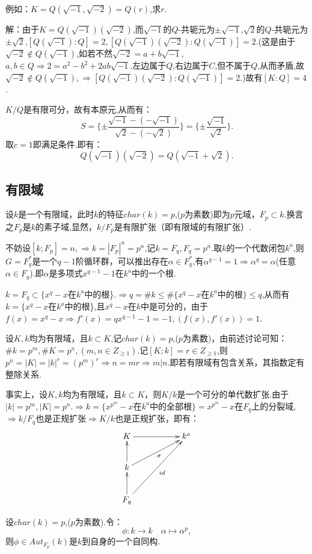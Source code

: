\documentclass[UTF8]{article}
\begin{document}
例如：$K=Q(\sqrt{-1},\sqrt{-2})=Q(r)$,求$r$.

解：由于$K=Q(\sqrt{-1})(\sqrt{-2})$,而$\sqrt{-1}$的$Q$-共轭元为$\pm \sqrt{-1}$,$\sqrt{2}$的$Q$-共轭元为$\pm \sqrt{2}$,$[Q(\sqrt{-1}):Q]=2,[Q(\sqrt{-1})(\sqrt{-2}):Q(\sqrt{-1})]=2$.(这是由于$\sqrt{-2}\notin Q(\sqrt{-1})$,如若不然$\sqrt{-2}=a+ b\sqrt{-1}$,$a,b\in Q\Rightarrow 2=a^2-b^2+2ab\sqrt{-1}.$左边属于$Q$,右边属于$C$,但不属于$Q$,从而矛盾,故$\sqrt{-2}\notin Q(\sqrt{-1}),\Rightarrow [Q(\sqrt{-1})(\sqrt{-2}):Q(\sqrt{-1})]=2$.)故有$[K:Q]=4$.

$K/Q$是有限可分，故有本原元,从而有：$$S=\{\pm\frac{\sqrt{-1}-(-\sqrt{-1})}{\sqrt{2}-(-\sqrt{2})}\}=\{\pm\frac{\sqrt{-1}}{\sqrt{2}}\}.$$取$c=1$即满足条件.即有：$$Q(\sqrt{-1})(\sqrt{-2})=Q(\sqrt{-1}+\sqrt{2}).$$

\subsection{有限域}
\normalsize

设$k$是一个有限域，此时$k$的特征$char(k)=p$,($p$为素数)即为$p$元域，$F_p\subset k$.换言之$F_p$是$k$的素子域,显然，$k/F_p$是有限扩张（即有限域的有限扩张）.

不妨设$[k;F_p]=n,\Rightarrow k=|F_p|^n=p^n$,记$k=F_q,F_q=p^n$.取$k$的一个代数闭包$k^a$,则$G=F_q^*$是一个$q-1$阶循环群，可以推出存在$\alpha\in F_q^*$,有$\alpha^{q-1}=1\Rightarrow \alpha^q=\alpha$(任意$\alpha\in F_q$).即$\alpha$是多项式$x^{q-1}-1$在$k^a$中的一个根.

$k=F_q\subset \{x^q-x$在$k^a$中的根\}.$\Rightarrow q=\# k\le \#\{x^q-x$在$k^a$中的根$\}\le q$,从而有$k=\{x^q-x$在$k^a$中的根\},且$x^q-x$在$k$中是可分的，由于$f(x)=x^q-x\Rightarrow f'(x)=qx^{q-1}-1=-1,(f(x),f'(x))=1$.

设$K,k$均为有限域，且$k\subset K$,记$char(k)=p$,($p$为素数)，由前述讨论可知：$\#k=p^m,\#K=p^n,(m,n\in Z_{\ge 1})$.记$[K;k]=r\in Z_{\ge 1}$,则$p^n=|K|=|k|^r=(p^m)^r\Rightarrow n=mr\Rightarrow m|n$.即若有限域有包含关系，其指数定有整除关系.

事实上，设$K,k$均为有限域，且$k\subset K$，则$K/k$是一个可分的单代数扩张.由于$|k|=p^m,|K|=p^n.\Rightarrow k=\{x^{p^m}-x$在$k^a$中的全部根$\}=x^{p^m}-x$在$F_q$上的分裂域,$\Rightarrow k/F_q$也是正规扩张$\Rightarrow K/k$也是正规扩张，即有：$$
\xymatrix{K\ar[rr]&&k^a\\k\ar[u]\ar[rru]_{\sigma}&\\F_q\ar[u]\ar[rruu]_{id}& }$$

设$char(k)=p$,($p$为素数).令：$$\phi:k\rightarrow k\quad \alpha\mapsto \alpha^p,$$则$\phi \in Aut_{F_p}(k)$是$k$到自身的一个自同构.
\end{document}
